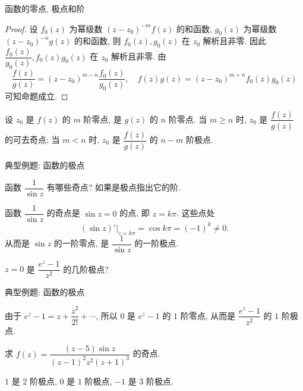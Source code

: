 \begin{frame}{函数的零点, 极点和阶}
\begin{proof}
设 $f_0(z)$ 为幂级数 $(z-z_0)^{-m}f(z)$ 的和函数, $g_0(z)$ 为幂级数 $(z-z_0)^{-n}g(z)$ 的和函数,
\onslide<+->
则 $f_0(z),g_0(z)$ 在 $z_0$ 解析且非零.
\onslide<+->
因此 $\dfrac{f_0(z)}{g_0(z)},f_0(z)g_0(z)$ 在 $z_0$ 解析且非零.
\onslide<+->
由
\vspace{-3pt}
\[\frac{f(z)}{g(z)}=(z-z_0)^{m-n}\frac{f_0(z)}{g_0(z)},\quad
f(z)g(z)=(z-z_0)^{m+n}f_0(z)g_0(z)\]
\vspace{-3pt}
可知命题成立.
\end{proof}
\begin{corollary}
设 $z_0$ 是 $f(z)$ 的 $m$ 阶零点, 是 $g(z)$ 的 $n$ 阶零点.
\onslide<+->
当 $m\ge n$ 时, $z_0$ 是 $\dfrac{f(z)}{g(z)}$ 的可去奇点; 当 $m<n$ 时, $z_0$ 是 $\dfrac{f(z)}{g(z)}$ 的 $n-m$ 阶极点.
\end{corollary}
\end{frame}


\begin{frame}{典型例题: 函数的极点}
\begin{example}
函数 $\dfrac1{\sin z}$ 有哪些奇点? 如果是极点指出它的阶.
\end{example}
\vspace{-2pt}
\begin{solution}
函数 $\dfrac1{\sin z}$ 的奇点是 $\sin z=0$ 的点, 即 $z=k\pi$.
\onslide<+->
这些点处
\[(\sin z)'|_{z=k\pi}=\cos{k\pi}=(-1)^k\neq 0.\]
\onslide<+->
从而是 $\sin z$ 的一阶零点, 是 $\dfrac1{\sin z}$ 的一阶极点.
\end{solution}
\vspace{-2pt}
\begin{example}
$z=0$ 是 $\dfrac{e^z-1}{z^2}$ 的几阶极点?
\end{example}
\end{frame}


\begin{frame}{典型例题: 函数的极点}
\begin{solution}
由于 $e^z-1=z+\dfrac{z^2}{2!}+\cdots$,
\onslide<+->
所以 $0$ 是 $e^z-1$ 的 $1$ 阶零点,
\onslide<+->
从而是 $\dfrac{e^z-1}{z^2}$ 的 $1$ 阶极点.
\end{solution}

\begin{exercise}
求 $f(z)=\dfrac{(z-5)\sin z}{(z-1)^2z^2(z+1)^3}$ 的奇点.
\end{exercise}
\begin{answer}
$1$ 是 $2$ 阶极点, $0$ 是 $1$ 阶极点, $-1$ 是 $3$ 阶极点.
\end{answer}
\end{frame}


